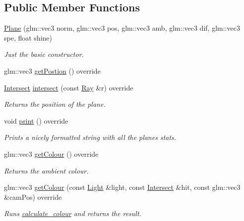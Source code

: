 \subsection*{Public Member Functions}
\begin{DoxyCompactItemize}
\item 
\mbox{\hyperlink{class_plane_a7aef2d9e06892562f982d9fd6596370c}{Plane}} (glm\+::vec3 norm, glm\+::vec3 pos, glm\+::vec3 amb, glm\+::vec3 dif, glm\+::vec3 spe, float shine)
\begin{DoxyCompactList}\small\item\em Just the basic constructor. \end{DoxyCompactList}\item 
glm\+::vec3 \mbox{\hyperlink{class_plane_a61c43d837a1921039d9b3466d1284741}{get\+Postion}} () override
\item 
\mbox{\hyperlink{struct_intersect}{Intersect}} \mbox{\hyperlink{class_plane_a76cf36bbdaaed72e59aa7ecd9dcb9dba}{intersect}} (const \mbox{\hyperlink{struct_ray}{Ray}} \&r) override
\begin{DoxyCompactList}\small\item\em Returns the position of the plane. \end{DoxyCompactList}\item 
void \mbox{\hyperlink{class_plane_a3d9139793b931279e3dcd1fd80a263c7}{print}} () override
\begin{DoxyCompactList}\small\item\em Prints a nicely formatted string with all the plane\textquotesingle{}s stats. \end{DoxyCompactList}\item 
glm\+::vec3 \mbox{\hyperlink{class_plane_a81494e203b2cd4bf67d00c2503e1929f}{get\+Colour}} () override
\begin{DoxyCompactList}\small\item\em Returns the ambient colour. \end{DoxyCompactList}\item 
glm\+::vec3 \mbox{\hyperlink{class_plane_a6f2ddd0896e72b7446e2f9acad20c7c3}{get\+Colour}} (const \mbox{\hyperlink{class_light}{Light}} \&light, const \mbox{\hyperlink{struct_intersect}{Intersect}} \&hit, const glm\+::vec3 \&cam\+Pos) override
\begin{DoxyCompactList}\small\item\em Runs \mbox{\hyperlink{util_8h_ae9aaa22b1b1c0249f8617f45eb99ad55}{calculate\+\_\+colour}} and returns the result. \end{DoxyCompactList}\end{DoxyCompactItemize}


